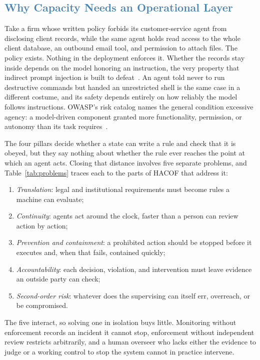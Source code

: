 \documentclass[journal]{IEEEtran}
\newcommand{\hacof}{HACOF}
\begin{document}
\subsection{\textcolor{steelblue}{Why Capacity Needs an Operational Layer}}
\label{sec:hacof-a}

Take a firm whose written policy forbids its customer-service agent from disclosing client records, while the same agent holds read access to the whole client database, an outbound email tool, and permission to attach files. The policy exists. Nothing in the deployment enforces it. Whether the records stay inside depends on the model honoring an instruction, the very property that indirect prompt injection is built to defeat~\cite{greshake2023injection}.
An agent told never to run destructive commands but handed an unrestricted shell is the same case in a different costume, and its safety depends entirely on how reliably the model follows instructions. OWASP's risk catalog names the general condition excessive agency: a model-driven component granted more functionality, permission, or autonomy than its task requires~\cite{owasp2025llm}.

The four pillars decide whether a state can write a rule and check that it is obeyed, but they say nothing about whether the rule ever reaches the point at which an agent acts. Closing that distance involves five separate problems, and Table~\ref{tab:problems} traces each to the parts of \hacof{} that address it:
\begin{enumerate}
  \item \textit{Translation}: legal and institutional requirements must become rules a machine can evaluate;
  \item \textit{Continuity}: agents act around the clock, faster than a person can review action by action;
  \item \textit{Prevention and containment}: a prohibited action should be stopped before it executes and, when that fails, contained quickly;
  \item \textit{Accountability}: each decision, violation, and intervention must leave evidence an outside party can check;
  \item \textit{Second-order risk}: whatever does the supervising can itself err, overreach, or be compromised.
\end{enumerate}
The five interact, so solving one in isolation buys little. Monitoring without enforcement records an incident it cannot stop, enforcement without independent review restricts arbitrarily, and a human overseer who lacks either the evidence to judge or a working control to stop the system cannot in practice intervene.
\end{document}
